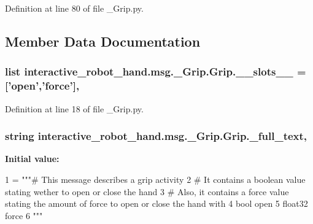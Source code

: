 Definition at line 80 of file \-\_\-\-Grip.\-py.



\subsection{Member Data Documentation}
\subsubsection[{\-\_\-\-\_\-slots\-\_\-\-\_\-}]{\setlength{\rightskip}{0pt plus 5cm}list interactive\-\_\-robot\-\_\-hand.\-msg.\-\_\-\-Grip.\-Grip.\-\_\-\-\_\-slots\-\_\-\-\_\- = ['{\bf open}','{\bf force}']\hspace{0.3cm}{\ttfamily [static]}, {\ttfamily [private]}}\label{classinteractive__robot__hand_1_1msg_1_1__Grip_1_1Grip_a4a9208aa26c8666bfed4774154eb217d}


Definition at line 18 of file \-\_\-\-Grip.\-py.

\subsubsection[{\-\_\-full\-\_\-text}]{\setlength{\rightskip}{0pt plus 5cm}string interactive\-\_\-robot\-\_\-hand.\-msg.\-\_\-\-Grip.\-Grip.\-\_\-full\-\_\-text\hspace{0.3cm}{\ttfamily [static]}, {\ttfamily [private]}}\label{classinteractive__robot__hand_1_1msg_1_1__Grip_1_1Grip_af4088b9429f156d9bc927699ae9960c1}
{\bfseries Initial value\-:}
\begin{DoxyCode}
1 = \textcolor{stringliteral}{"""# This message describes a grip activity}
2 \textcolor{stringliteral}{# It contains a boolean value stating wether to open or close the hand}
3 \textcolor{stringliteral}{# Also, it contains a force value stating the amount of force to open or close the hand with}
4 \textcolor{stringliteral}{bool open}
5 \textcolor{stringliteral}{float32 force}
6 \textcolor{stringliteral}{"""}
\end{DoxyCode}


